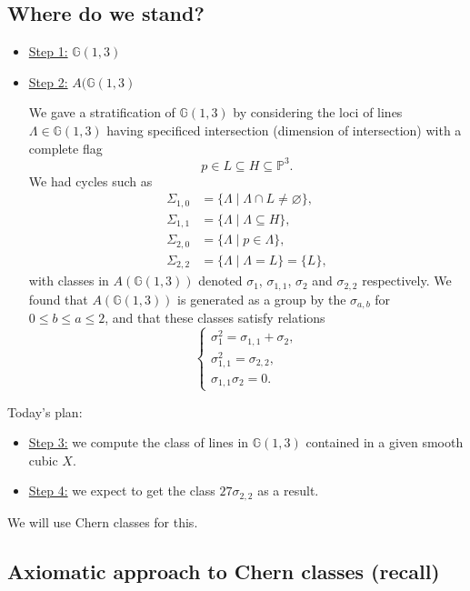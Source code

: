 \documentclass[12pt,a4paper]{amsart}
\theoremstyle{plain}
\theoremstyle{definition}
\theoremstyle{remark}
\begin{document}
\subsection{Where do we stand?}

\begin{itemize}
  \item \underline{Step 1:} $\mathbb{G}(1,3)$ \checkmark
  \item \underline{Step 2:} $A(\mathbb{G}(1,3)$ \checkmark

    We gave a stratification of $\mathbb{G}(1,3)$ by considering the loci of lines $\Lambda \in \mathbb{G}(1,3)$ having specificed intersection (dimension of intersection) with a complete flag
    \[ p \in L \subseteq H \subseteq \mathbb{P}^{3}. \]
    We had cycles such as
    \begin{align*}
      \Sigma_{1,0} & = \{ \Lambda \mid \Lambda \cap L \neq \varnothing \}, \\
      \Sigma_{1,1} & = \{ \Lambda \mid \Lambda \subseteq H \}, \\
      \Sigma_{2,0} & = \{ \Lambda \mid p \in \Lambda \}, \\
      \Sigma_{2,2} & = \{ \Lambda \mid \Lambda = L \} = \{L\},
    \end{align*}
    with classes in $A(\mathbb{G}(1,3))$ denoted $\sigma_{1}$, $\sigma_{1,1}$, $\sigma_{2}$ and $\sigma_{2,2}$ respectively.
    We found that $A(\mathbb{G}(1,3))$ is generated as a group by the $\sigma_{a,b}$ for $0 \leq b \leq a \leq 2$, and that these classes satisfy relations
    \[ \begin{cases}
      \sigma_{1}^{2} = \sigma_{1,1} + \sigma_{2}, \\
      \sigma_{1,1}^{2} = \sigma_{2,2}, \\
      \sigma_{1,1}\sigma_{2} = 0.
    \end{cases} \]
\end{itemize}

Today's plan:
\begin{itemize}
  \item \underline{Step 3:} we compute the class of lines in $\mathbb{G}(1,3)$ contained in a given smooth cubic $X$.
  \item \underline{Step 4:} we expect to get the class $27\sigma_{2,2}$ as a result.
\end{itemize}

We will use Chern classes for this.

\subsection{Axiomatic approach to Chern classes (recall)}
\end{document}
